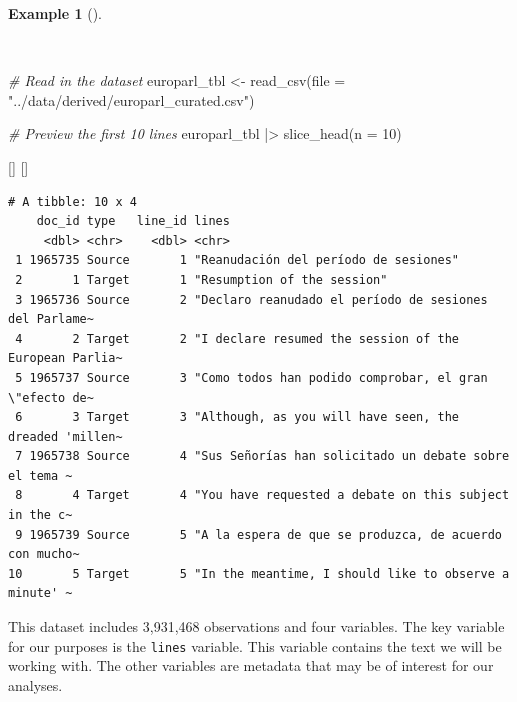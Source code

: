 \documentclass[
  letterpaper,
  krantz1]{latex/krantz-mod}
\newenvironment{Shaded}{\begin{snugshade}}{\end{snugshade}}
\newcommand{\AttributeTok}[1]{\textcolor[rgb]{0.00,0.00,0.00}{#1}}
\newcommand{\CommentTok}[1]{\textcolor[rgb]{0.00,0.00,0.00}{\textit{#1}}}
\newcommand{\DecValTok}[1]{\textcolor[rgb]{0.00,0.00,0.00}{#1}}
\newcommand{\FunctionTok}[1]{\textcolor[rgb]{0.00,0.00,0.00}{#1}}
\newcommand{\NormalTok}[1]{\textcolor[rgb]{0.00,0.00,0.00}{#1}}
\newcommand{\OtherTok}[1]{\textcolor[rgb]{0.00,0.00,0.00}{#1}}
\newcommand{\SpecialCharTok}[1]{\textcolor[rgb]{0.00,0.00,0.00}{#1}}
\newcommand{\StringTok}[1]{\textcolor[rgb]{0.00,0.00,0.00}{#1}}
\newcommand{\cindex}[1]{%
  \StrSubstitute{#1}{_}{\_}[\temp]%
  \index{\temp}%
}
\theoremstyle{definition}
\theoremstyle{definition}
\newtheorem{example}{Example}[chapter]
\theoremstyle{remark}
\begin{document}
\begin{example}[]\protect\hypertarget{exm-transform-europarl-preview}{}\label{exm-transform-europarl-preview}

~

\begin{Shaded}
\begin{Highlighting}[numbers=left,,]
\CommentTok{\# Read in the dataset}
\NormalTok{europarl\_tbl }\OtherTok{\textless{}{-}}
  \FunctionTok{read\_csv}\NormalTok{(}\AttributeTok{file =} \StringTok{"../data/derived/europarl\_curated.csv"}\NormalTok{)}

\CommentTok{\# Preview the first 10 lines}
\NormalTok{europarl\_tbl }\SpecialCharTok{|\textgreater{}}
  \FunctionTok{slice\_head}\NormalTok{(}\AttributeTok{n =} \DecValTok{10}\NormalTok{)}
\end{Highlighting}
\end{Shaded}

\cindex{read_csv()}\cindex{slice_head()}

\begin{verbatim}
# A tibble: 10 x 4
    doc_id type   line_id lines                                                 
     <dbl> <chr>    <dbl> <chr>                                                 
 1 1965735 Source       1 "Reanudación del período de sesiones"                 
 2       1 Target       1 "Resumption of the session"                           
 3 1965736 Source       2 "Declaro reanudado el período de sesiones del Parlame~
 4       2 Target       2 "I declare resumed the session of the European Parlia~
 5 1965737 Source       3 "Como todos han podido comprobar, el gran \"efecto de~
 6       3 Target       3 "Although, as you will have seen, the dreaded 'millen~
 7 1965738 Source       4 "Sus Señorías han solicitado un debate sobre el tema ~
 8       4 Target       4 "You have requested a debate on this subject in the c~
 9 1965739 Source       5 "A la espera de que se produzca, de acuerdo con mucho~
10       5 Target       5 "In the meantime, I should like to observe a minute' ~
\end{verbatim}

\end{example}

This dataset includes 3,931,468 observations and
four variables. The key variable for our purposes is
the \texttt{lines} variable. This variable contains the text we will be
working with. The other variables are metadata that may
be of interest for our analyses.
\end{document}
